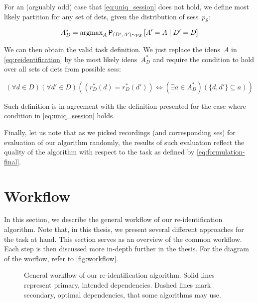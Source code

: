 For an (arguably odd) case that \autoref{eq:uniq_session} does not hold, we
define most likely partition for any set of \glspl{det}, given the distribution
of \glspl{ses}~$p_\mathcal{S}$: 

\begin{equation}
A^*_D = \text{argmax}_A \operatorname{\textsf{P}}_{(D', A')\sim p_\mathcal{S}} \left[A' = A \mid D' = D\right]
\label{eq:mla}
\end{equation}

We can then obtain the valid task definition. We just replace the
\glspl{iden}~$A$ in \autoref{eq:reidentification} by the most likely
\glspl{iden}~$A_D^*$ and require the condition to hold over all sets of
\glspl{det} from possible \glspl{ses}:

\begin{equation}
(\forall d \in D) (\forall d' \in D) ((r_D^*(d) = r_D^*(d')) \Leftrightarrow (\exists a \in A_D^*) (\{d, d'\} \subseteq a))
\label{eq:formulation-final}
\end{equation}


Such definition is in agreement with the definition presented for the case where condition in \autoref{eq:uniq_session} holds.


Finally, let us note that as we picked recordings (and corresponding \gls{ses}) for evaluation of our algorithm randomly, the results of such evaluation reflect the quality of the algorithm with respect to the task as defined by \autoref{eq:formulation-final}.


\section{Workflow}

\label{sec:workflow}


In this section, we describe the general workflow of our re-identification algorithm. Note that, in this thesis, we present several different approaches for the task at hand. This section serves as an overview of the common workflow. Each step is then discussed more in-depth further in the thesis. For the diagram of the worflow, refer to \autoref{fig:workflow}.

\begin{figure}
    \centering
    \def\svgwidth{\textwidth}
    
    \caption[General workflow of our re-identification algorithm]{General workflow of our re-identification algorithm. Solid lines represent primary, intended dependencies.
    Dashed lines mark secondary, optimal dependencies, that some algorithms may use.}
    \label{fig:workflow}
\end{figure}

